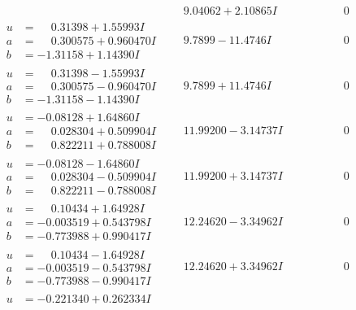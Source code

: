 \documentclass[1p]{elsarticle_modified}
\theoremstyle{definition}
\begin{document}
$$\begin{array}{c|c|c}
 & \phantom{-}9.04062 + 2.10865 I & \phantom{-0.000000 } 0 \\ \hline\begin{aligned}
u &= \phantom{-}0.31398 + 1.55993 I \\
a &= \phantom{-}0.300575 + 0.960470 I \\
b &= -1.31158 + 1.14390 I\end{aligned}
 & \phantom{-}9.7899 - 11.4746 I & \phantom{-0.000000 } 0 \\ \hline\begin{aligned}
u &= \phantom{-}0.31398 - 1.55993 I \\
a &= \phantom{-}0.300575 - 0.960470 I \\
b &= -1.31158 - 1.14390 I\end{aligned}
 & \phantom{-}9.7899 + 11.4746 I & \phantom{-0.000000 } 0 \\ \hline\begin{aligned}
u &= -0.08128 + 1.64860 I \\
a &= \phantom{-}0.028304 + 0.509904 I \\
b &= \phantom{-}0.822211 + 0.788008 I\end{aligned}
 & \phantom{-}11.99200 - 3.14737 I & \phantom{-0.000000 } 0 \\ \hline\begin{aligned}
u &= -0.08128 - 1.64860 I \\
a &= \phantom{-}0.028304 - 0.509904 I \\
b &= \phantom{-}0.822211 - 0.788008 I\end{aligned}
 & \phantom{-}11.99200 + 3.14737 I & \phantom{-0.000000 } 0 \\ \hline\begin{aligned}
u &= \phantom{-}0.10434 + 1.64928 I \\
a &= -0.003519 + 0.543798 I \\
b &= -0.773988 + 0.990417 I\end{aligned}
 & \phantom{-}12.24620 - 3.34962 I & \phantom{-0.000000 } 0 \\ \hline\begin{aligned}
u &= \phantom{-}0.10434 - 1.64928 I \\
a &= -0.003519 - 0.543798 I \\
b &= -0.773988 - 0.990417 I\end{aligned}
 & \phantom{-}12.24620 + 3.34962 I & \phantom{-0.000000 } 0 \\ \hline\begin{aligned}
u &= -0.221340 + 0.262334 I \\

\end{aligned}
\end{array}$$
\end{document}
